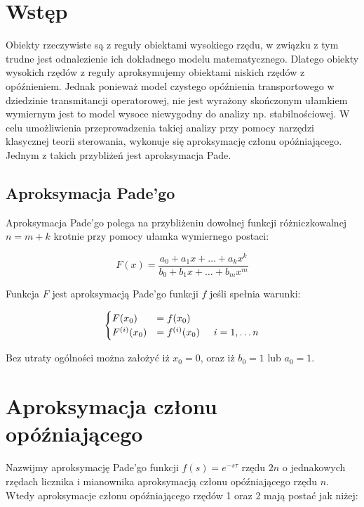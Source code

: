\documentclass[12pt]{article}
\begin{document}


\section{Wstęp}

Obiekty rzeczywiste są z reguły obiektami wysokiego rzędu, w związku z tym
trudne jest odnalezienie ich dokładnego modelu matematycznego. Dlatego
obiekty wysokich rzędów z reguły aproksymujemy obiektami niskich rzędów z
opóźnieniem. Jednak ponieważ model czystego opóźnienia transportowego w
dziedzinie transmitancji operatorowej, nie jest wyrażony skończonym ułamkiem
wymiernym jest to model wysoce niewygodny do analizy np. stabilnościowej. W celu
umożliwienia przeprowadzenia takiej analizy przy pomocy narzędzi klasycznej
teorii sterowania, wykonuje się aproksymację członu opóźniającego. Jednym z
takich przybliżeń jest aproksymacja Pade.

\subsection{Aproksymacja Pade'go}

Aproksymacja Pade'go polega na przybliżeniu dowolnej funkcji różniczkowalnej
$n=m+k$ krotnie przy pomocy ułamka wymiernego postaci:

\begin{equation*}
	F(x) = \frac{a_0+a_1x+\ldots +a_kx^k}{b_0+b_1x+\ldots +b_mx^m}
\end{equation*}

Funkcja $F$ jest aproksymacją Pade'go funkcji $f$ jeśli spełnia warunki:

\begin{equation*}
	\begin{cases}
		F(x_0) & = f(x_0) \\[0cm]
		F^{(i)}(x_0) & =
		f^{(i)}(x_0) \hspace{0.5cm} i=1,\ldots n
	\end{cases}
\end{equation*}

Bez utraty ogólności można założyć iż $x_0=0$, oraz iż $b_0=1$ lub $a_0=1$.

\section{Aproksymacja członu opóźniającego}

Nazwijmy aproksymację Pade'go funkcji $f(s)=e^{-s\tau}$ rzędu $2n$ o
jednakowych rzędach licznika i mianownika aproksymacją członu opóźniającego
rzędu $n$. Wtedy aproksymacje członu opóźniającego rzędów 1 oraz 2 mają postać
jak niżej:
\end{document}
